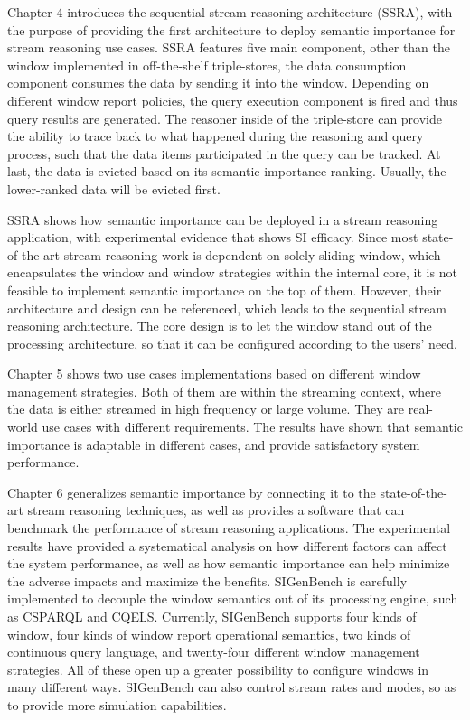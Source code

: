 Chapter 4 introduces the sequential stream reasoning architecture (SSRA), with the purpose of providing the first architecture to deploy semantic importance for stream reasoning use cases. 
SSRA features five main component, other than the window implemented in off-the-shelf triple-stores, the data consumption component consumes the data by sending it into the window. 
Depending on different window report policies, the query execution component is fired and thus query results are generated. 
The reasoner inside of the triple-store can provide the ability to trace back to what happened during the reasoning and query process, such that the data items participated in the query can be tracked.
At last, the data is evicted based on its semantic importance ranking.
Usually, the lower-ranked data will be evicted first. 

SSRA shows how semantic importance can be deployed in a stream reasoning application, with experimental evidence that shows SI efficacy. 
Since most state-of-the-art stream reasoning work is dependent on solely sliding window, which encapsulates the window and window strategies within the internal core, it is not feasible to implement semantic importance on the top of them. 
However, their architecture and design can be referenced, which leads to the sequential stream reasoning architecture. 
The core design is to let the window stand out of the processing architecture, so that it can be configured according to the users' need. 


Chapter 5 shows two use cases implementations based on different window management strategies.
Both of them are within the streaming context, where the data is either streamed in high frequency or large volume. 
They are real-world use cases with different requirements.
The results have shown that semantic importance is adaptable in different cases, and provide satisfactory system performance. 

Chapter 6 generalizes semantic importance by connecting it to the state-of-the-art stream reasoning techniques, as well as provides a software that can benchmark the performance of stream reasoning applications.
The experimental results have provided a systematical analysis on how different factors can affect the system performance, as well as how semantic importance can help minimize the adverse impacts and maximize the benefits. 
SIGenBench is carefully implemented to decouple the window semantics out of its processing engine, such as CSPARQL and CQELS. 
Currently, SIGenBench supports four kinds of window, four kinds of window report operational semantics, two kinds of continuous query language, and twenty-four different window management strategies. 
All of these open up a greater possibility to configure windows in many different ways. 
SIGenBench can also control stream rates and modes, so as to provide more simulation capabilities. 
%
